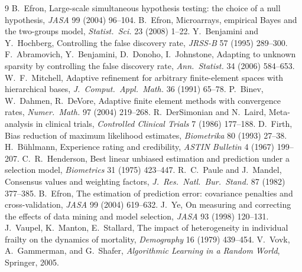 \documentclass[11pt]{article}
\begin{document}
\begin{thebibliography}{9}\small
{} B.~Efron, Large-scale simultaneous hypothesis testing: the choice
of a null hypothesis, \emph{JASA} 99 (2004) 96--104.
 B.~Efron, Microarrays, empirical Bayes and the two-groups model,
\emph{Statist.\ Sci.} 23 (2008) 1--22.
 Y.~Benjamini and Y.~Hochberg, Controlling the false discovery rate,
\emph{JRSS-B} 57 (1995) 289--300.
 F.~Abramovich, Y.~Benjamini, D.~Donoho, I.~Johnstone, Adapting
to unknown sparsity by controlling the false discovery rate, \emph{Ann.\ Statist.} 34
(2006) 584--653.
 W.~F.~Mitchell, Adaptive refinement for arbitrary finite-element
spaces with hierarchical bases, \emph{J.\ Comput.\ Appl.\ Math.} 36 (1991) 65--78.
 P.~Binev, W.~Dahmen, R.~DeVore, Adaptive finite element methods
with convergence rates, \emph{Numer.\ Math.} 97 (2004) 219--268.
 R.~DerSimonian and N.~Laird, Meta-analysis in clinical trials,
\emph{Controlled Clinical Trials} 7 (1986) 177--188.
 D.~Firth, Bias reduction of maximum likelihood estimates,
\emph{Biometrika} 80 (1993) 27--38.
 H.~B\"uhlmann, Experience rating and credibility,
\emph{ASTIN Bulletin} 4 (1967) 199--207.
 C.~R.~Henderson, Best linear unbiased estimation and
prediction under a selection model, \emph{Biometrics} 31 (1975) 423--447.
 R.~C.~Paule and J.~Mandel, Consensus values and weighting factors,
\emph{J.\ Res.\ Natl.\ Bur.\ Stand.} 87 (1982) 377--385.
 B.~Efron, The estimation of prediction error: covariance
penalties and cross-validation, \emph{JASA} 99 (2004) 619--632.
 J.~Ye, On measuring and correcting the effects of data mining and
model selection, \emph{JASA} 93 (1998) 120--131.
 J.~Vaupel, K.~Manton, E.~Stallard, The impact of heterogeneity in
individual frailty on the dynamics of mortality, \emph{Demography} 16 (1979) 439--454.
 V.~Vovk, A.~Gammerman, and G.~Shafer, \emph{Algorithmic Learning in a Random
World}, Springer, 2005.
\end{thebibliography}
\end{document}

